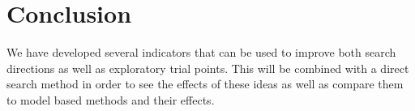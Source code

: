 
\section{Conclusion}
We have developed several indicators that can be used to improve both search directions as well as exploratory trial points.  This will be combined with a direct search method in order to see the effects of these ideas as well as compare them to model based methods and their effects.








%
